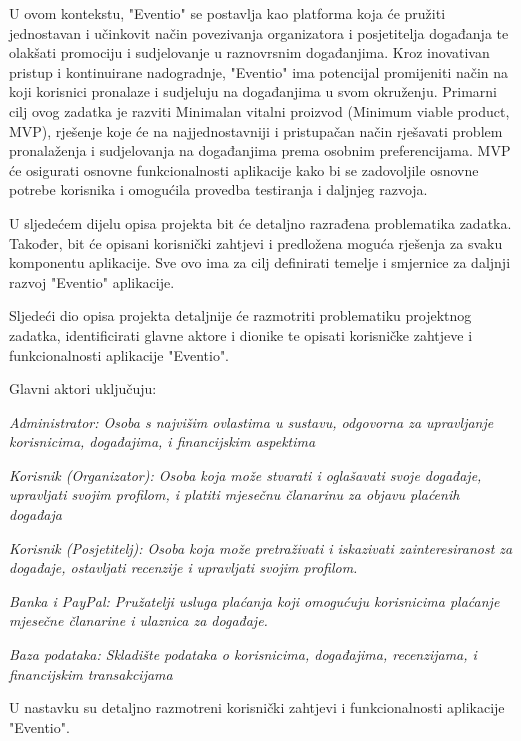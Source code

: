 		U ovom kontekstu, "Eventio" se postavlja kao platforma koja će pružiti jednostavan i učinkovit način povezivanja organizatora i posjetitelja događanja te olakšati promociju i sudjelovanje u raznovrsnim događanjima. Kroz inovativan pristup i kontinuirane nadogradnje, "Eventio" ima potencijal promijeniti način na koji korisnici pronalaze i sudjeluju na događanjima u svom okruženju.
		Primarni cilj ovog zadatka je razviti Minimalan vitalni proizvod (Minimum viable product, MVP), rješenje koje će na najjednostavniji i pristupačan način rješavati problem pronalaženja i sudjelovanja na događanjima prema osobnim preferencijama. MVP će osigurati osnovne funkcionalnosti aplikacije kako bi se zadovoljile osnovne potrebe korisnika i omogućila provedba testiranja i daljnjeg razvoja.
		
		U sljedećem dijelu opisa projekta bit će detaljno razrađena problematika zadatka. Također, bit će opisani korisnički zahtjevi i predložena moguća rješenja za svaku komponentu aplikacije. Sve ovo ima za cilj definirati temelje i smjernice za daljnji razvoj "Eventio" aplikacije.
		
		Sljedeći dio opisa projekta detaljnije će razmotriti problematiku projektnog zadatka, identificirati glavne aktore i dionike te opisati korisničke zahtjeve i funkcionalnosti aplikacije "Eventio".
		
		Glavni aktori uključuju:
		\begin{packed_item}
			\item \textit{Administrator: Osoba s najvišim ovlastima u sustavu, odgovorna za upravljanje korisnicima, događajima, i financijskim aspektima}
			\item \textit{Korisnik (Organizator): Osoba koja može stvarati i oglašavati svoje događaje, upravljati svojim profilom, i platiti mjesečnu članarinu za objavu plaćenih događaja}
			\item \textit{Korisnik (Posjetitelj): Osoba koja može pretraživati i iskazivati zainteresiranost za događaje, ostavljati recenzije i upravljati svojim profilom.}
			\item \textit{Banka i PayPal: Pružatelji usluga plaćanja koji omogućuju korisnicima plaćanje mjesečne članarine i ulaznica za događaje.}
			\item \textit{Baza podataka: Skladište podataka o korisnicima, događajima, recenzijama, i financijskim transakcijama}
		\end{packed_item}
		
		U nastavku su detaljno razmotreni korisnički zahtjevi i funkcionalnosti aplikacije "Eventio".
		
